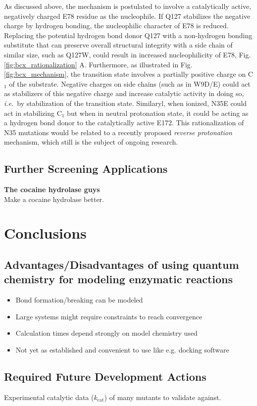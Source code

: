 As discussed above, the mechanism is postulated to involve a catalytically active, negatively charged E78 residue as the nucleophile.
If Q127 stabilizes the negative charge by hydrogen bonding, the nucleophilic character of E78 is reduced.
Replacing the potential hydrogen bond donor Q127 with a non-hydrogen bonding substitute that can preserve overall structural integrity with a side chain of similar size, such as Q127W, could result in increased nucleophilicity of E78, Fig. \ref{fig:bcx_rationalization} A.
Furthermore, as illustrated in Fig. \ref{fig:bcx_mechanism}, the transition state involves a partially positive charge on C$_1$ of the substrate.
Negative charges on side chains (such as in W9D/E) could act as stabilizers of this negative charge and increase catalytic activity in doing so, \textit{i.e.} by stabilization of the transition state.
Similaryl, when ionized, N35E could act in stabilizing C$_1$ but when in neutral protonation state, it could be acting as a hydrogen bond donor to the catalytically active E172.
This rationalization of N35 mutations would be related to a recently proposed \textit{reverse protonation} mechanism\cite{joshi2000hydrogen}, which still is the subject of ongoing research.

\newpage
\subsection{Further Screening Applications}
\textbf{The cocaine hydrolase guys}\\
Make a cocaine hydrolase better\cite{gao2006computational}.



\section{Conclusions}\label{sec:conclusions}

\subsection{Advantages/Disadvantages of using quantum chemistry for modeling enzymatic reactions}
\begin{itemize}
\item Bond formation/breaking can be modeled
\item Large systems might require constraints to reach convergence
\item Calculation times depend strongly on model chemistry used
\item Not yet as established and convenient to use like e.g. docking software
\end{itemize}

\subsection{Required Future Development Actions}
Experimental catalytic data ($k_\text{cat}$) of many mutants to validate against.
